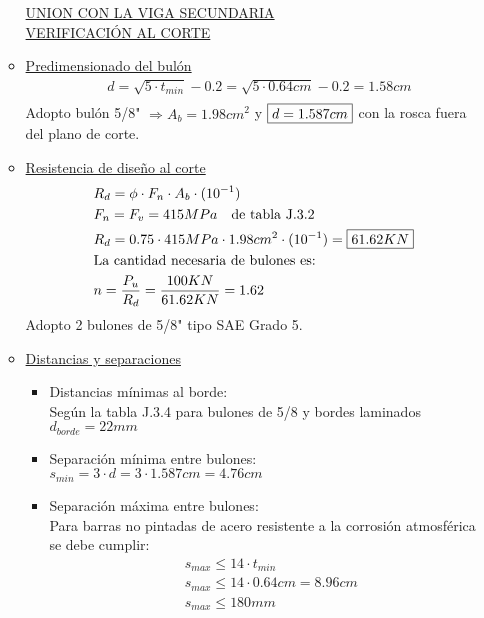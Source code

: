 \begin{enumerate}
\begin{itemize}
\begin{center}
\underline{UNION CON LA VIGA SECUNDARIA}\\
\underline{VERIFICACIÓN AL CORTE}
\end{center}

\item \underline{Predimensionado del bulón}
\begin{align*}
& d = \sqrt{5 \cdot t_{min}} - 0.2 = \sqrt{5 \cdot 0.64 cm} - 0.2 = 1.58cm\\
\end{align*}
Adopto bulón 5/8" $\Rightarrow A_b = 1.98 cm^2$ y $\framebox{$d = 1.587 cm$}$ con la rosca fuera del plano de corte.

\item \underline{Resistencia de diseño al corte}
\begin{align*}
& R_d = \phi \cdot F_n \cdot A_b \cdot (10^{-1})\\
& F_n = F_v = 415MPa \quad \text{de tabla J.3.2}\\
& R_d = 0.75 \cdot 415 MPa \cdot 1.98 cm^2 \cdot (10^{-1}) = \framebox{$61.62 KN$}\\
& \text{La cantidad necesaria de bulones es:}\\
& n = \frac{P_u}{R_d} = \frac{100KN}{61.62KN} = 1.62
\end{align*}
Adopto 2 bulones de 5/8" tipo SAE Grado 5.

\item \underline{Distancias y separaciones}
	\begin{itemize}
	\item Distancias mínimas al borde:\\
	Según la tabla J.3.4 para bulones de 5/8 y bordes laminados $d_{borde} = 22 mm$
	\item Separación mínima entre bulones:\\
	$s_{min} = 3 \cdot d = 3 \cdot 1.587cm = 4.76cm$
	\item Separación máxima entre bulones:\\
	Para barras no pintadas de acero resistente a la corrosión atmosférica se debe cumplir:
	\begin{align*}
	& s_{max} \leq 14 \cdot t_{min}\\
	& s_{max} \leq 14 \cdot 0.64cm = 8.96cm\\
	& s_{max} \leq 180mm
	\end{align*}
	\end{itemize}


\end{itemize}
\end{enumerate}

